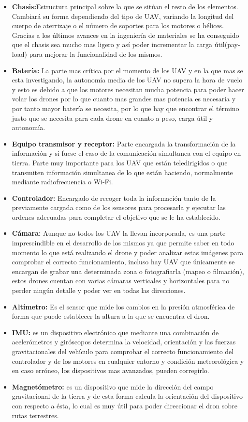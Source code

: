 \begin{itemize}
		\item \textbf{Chasis:}Estructura principal  sobre  la  que  se sitúan el resto de los elementos. Cambiará su forma dependiendo del tipo de UAV, variando la longitud del cuerpo de aterrizaje o el número de soportes para los motores o hélices. Gracias a los últimos avances en la ingeniería de materiales se ha conseguido que el chasis sea mucho mas ligero y así poder incrementar la carga útil(pay-load) para mejorar la funcionalidad de los mismos.
		\item \textbf{Batería:} La parte mas crítica por el momento de los UAV y en la que mas se esta investigando, la autonomía media de los UAV no supera la hora de vuelo y esto es debido a que los motores necesitan mucha potencia para poder hacer volar los drones por lo que cuanto mas grandes mas potencia es necesaria y por tanto mayor batería se necesita, por lo que hay que encontrar el término justo que se necesita para cada drone en cuanto a peso, carga útil y autonomía. 
		\item \textbf{Equipo transmisor y receptor:} Parte encargada la transformación de la información y si fuese el caso de la comunicación simultanea con el equipo en tierra. Parte muy importante para los UAV que están teledirigidos o que transmiten información simultanea de lo que están haciendo, normalmente mediante radiofrecuencia o Wi-Fi.
		\item \textbf{Controlador:} Encargado de recoger toda la información tanto de la previamente cargada como de los sensores para procesarla y ejecutar las ordenes adecuadas para completar el objetivo que se le ha establecido. 
		\item \textbf{Cámara:} Aunque no todos los UAV la llevan incorporada, es una parte imprescindible en el desarrollo de los mismos ya que permite saber en todo momento lo que está realizando el drone y poder analizar estas imágenes para comprobar el correcto funcionamiento, incluso hay UAV que únicamente se encargan de grabar una determinada zona o fotografiarla (mapeo o filmación), estos drones cuentan con varias cámaras verticales y horizontales para no perder ningún detalle y poder ver en todas las direcciones.
		\item \textbf{Altímetro:} Es el sensor que mide los cambios en la presión atmosférica de forma que puede establecer la altura a la que se encuentra el dron.
		\item \textbf{IMU:} es un dispositivo electrónico que mediante una combinación de acelerómetros y giróscopos determina la velocidad, orientación y las fuerzas gravitacionales del vehículo para comprobar el correcto funcionamiento del controlador y de los motores en cualquier entorno y condición meteorológica y en caso erróneo, los dispositivos mas avanzados, pueden corregirlo.
		\item \textbf{Magnetómetro:} es un dispositivo que mide la dirección del campo gravitacional de la tierra y de esta forma calcula la orientación del dispositivo con respecto a ésta, lo cual es muy útil para poder direccionar el dron sobre rutas terrestres.
	\end{itemize}

